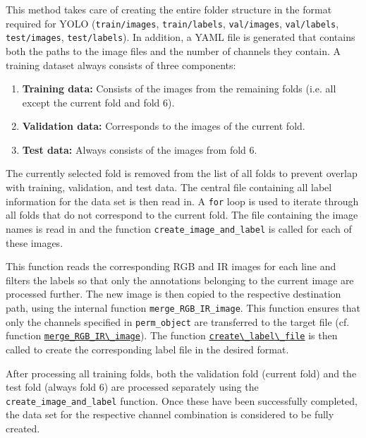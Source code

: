 This method takes care of creating the entire folder structure in the format required for \acrshort{YOLO} (\texttt{train/images}, \texttt{train/labels}, \texttt{val/images}, \texttt{val/labels}, \texttt{test/images}, \texttt{test/labels}). In addition, a \acrshort{YAML} file is generated that contains both the paths to the image files and the number of channels they contain. A training dataset always consists of three components: 
\begin{enumerate}
    \item \textbf{Training data:} Consists of the images from the remaining folds (i.e. all except the current fold and fold 6).
    \item \textbf{Validation data:} Corresponds to the images of the current fold.
    \item \textbf{Test data:} Always consists of the images from fold 6.
\end{enumerate}

The currently selected fold is removed from the list of all folds to prevent overlap with training, validation, and test data. The central file containing all label information for the data set is then read in. A \texttt{for} loop is used to iterate through all folds that do not correspond to the current fold. The file containing the image names is read in and the function \lstinline|create_image_and_label| is called for each of these images.

This function reads the corresponding \acrshort{RGB} and \acrshort{IR} images for each line and filters the labels so that only the annotations belonging to the current image are processed further. The new image is then copied to the respective destination path, using the internal function \lstinline|merge_RGB_IR_image|. This function ensures that only the channels specified in \lstinline|perm_object| are transferred to the target file (cf. function \hyperlink{par:merge_RGB_IR}{\lstinline|merge_RGB_IR\_image|}). The function \hyperlink{par:create_label_file}{\lstinline|create\_label\_file|} is then called to create the corresponding label file in the desired format.

After processing all training folds, both the validation fold (current fold) and the test fold (always fold 6) are processed separately using the \lstinline|create_image_and_label| function. Once these have been successfully completed, the data set for the respective channel combination is considered to be fully created.


